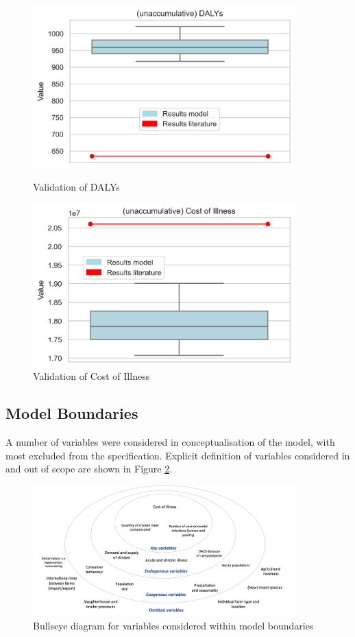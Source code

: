 \begin{figure}[!h]
    \centering
    \begin{minipage}{0.45\textwidth}
        \centering
        \includegraphics[width=0.9\textwidth]{notebooks/dalys2.png} %
        \caption{Validation of DALYs}
	    \label{fig:val_dalys}
    \end{minipage}\hfill
    \begin{minipage}{0.45\textwidth}
        \centering
        \includegraphics[width=0.9\textwidth]{notebooks/coi2.png} %
        \caption{Validation of Cost of Illness}
	    \label{fig:val_coi}
    \end{minipage}
\end{figure}

\subsection{Model Boundaries}
A number of variables were considered in conceptualisation of the model, with most excluded from the specification. Explicit definition of variables considered in and out of scope are shown in  Figure \ref{fig:bullseye}.

\begin{figure}[h]
\centering
\includegraphics[width=0.90\textwidth]{images/bullseye.png}
\caption{Bullseye diagram for variables considered within model boundaries}
\label{fig:bullseye}
\end{figure}


